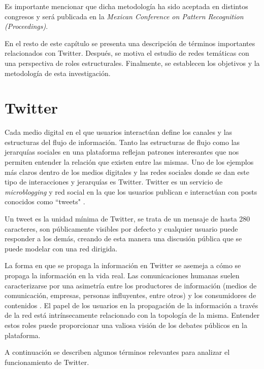 Es importante mencionar que dicha metodología ha sido aceptada en distintos congresos y será publicada en la \textit{Mexican Conference on Pattern Recognition (Proceedings)}.

En el resto de este capítulo se presenta una descripción de términos importantes relacionados con Twitter. Después, se motiva el estudio de redes temáticas con una perspectiva de roles estructurales. Finalmente, se establecen los objetivos y la metodología de esta investigación. 

\section{Twitter} 

Cada medio digital en el que usuarios interactúan define los canales y las estructuras del flujo de información. Tanto las estructuras de flujo como las jerarquías sociales en una plataforma reflejan patrones interesantes que nos permiten entender la relación que existen entre las mismas. Uno de los ejemplos más claros dentro de los medios digitales y las redes sociales donde se dan este tipo de interacciones y jerarquías es Twitter. Twitter es un servicio de \textit{microblogging} y red social en la que los usuarios publican e interactúan con posts conocidos como “tweets" \cite{twitter_twittercom_nodate}. 

Un tweet es la unidad mínima de Twitter, se trata de un mensaje de hasta 280 caracteres, son públicamente visibles por defecto y cualquier usuario puede responder a los demás, creando de esta manera una discusión pública que se puede modelar con una red dirigida.

La forma en que se propaga la información en Twitter se asemeja a cómo se propaga la información en la vida real. Las comunicaciones humanas suelen caracterizarse por una asimetría entre los productores de información (medios de comunicación, empresas, personas influyentes, entre otros) y los consumidores de contenidos \cite{gabielkov_studying_2014}. El papel de los usuarios en la propagación de la información a través de la red está intrínsecamente relacionado con la topología de la misma. Entender estos roles puede proporcionar una valiosa visión de los debates públicos en la plataforma. 

A continuación se describen algunos términos relevantes para analizar el funcionamiento de Twitter. 


